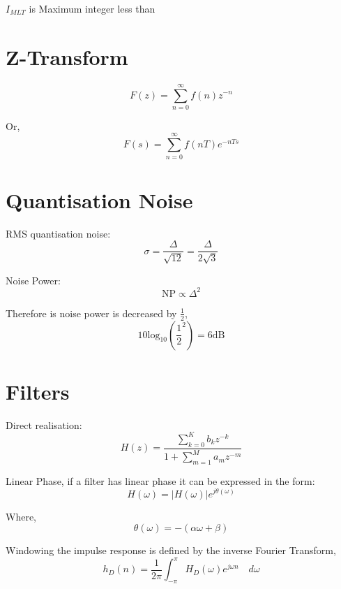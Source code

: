 \documentclass[12pt]{article}
\begin{document}
$I_{MLT}$ is Maximum integer less than

\section{Z-Transform}
\begin{equation}
    F(z)=\sum_{n=0}^{\infty}f(n)z^{-n}
\end{equation}

Or,
\begin{equation}
    F(s)=\sum_{n=0}^{\infty}f(nT)e^{-nTs}
\end{equation}

\section{Quantisation Noise}

RMS quantisation noise:
\begin{equation}
    \sigma = \frac{\Delta}{\sqrt{12}} = \frac{\Delta}{2\sqrt{3}}
\end{equation}

Noise Power:
\begin{equation}
    \textrm{NP} \propto \Delta^2
\end{equation}

Therefore is noise power is decreased by $\frac{1}{2}$,
\begin{equation}
    10\textrm{log}_{10}\left(\frac{1}{2}^2\right) = 6\textrm{dB}
\end{equation}

\section{Filters}

Direct realisation:
\begin{equation}
    H(z) = \frac{\sum_{k=0}^K b_k z^{-k}}{1+\sum_{m=1}^M a_m z^{-m}}
\end{equation}

Linear Phase, if a filter has linear phase it can be expressed in the form:
\begin{equation}
    H(\omega) = |H(\omega)|e^{j\theta(\omega)}
\end{equation}

Where,
\begin{equation}
    \theta(\omega) = -(\alpha\omega+\beta)
\end{equation}

Windowing the impulse response is defined by the inverse Fourier Transform,
\begin{equation}
    h_D(n) = \frac{1}{2\pi} \int_{-\pi}^\pi H_D(\omega)e^{j\omega n} \quad d\omega 
\end{equation} 
\end{document}
